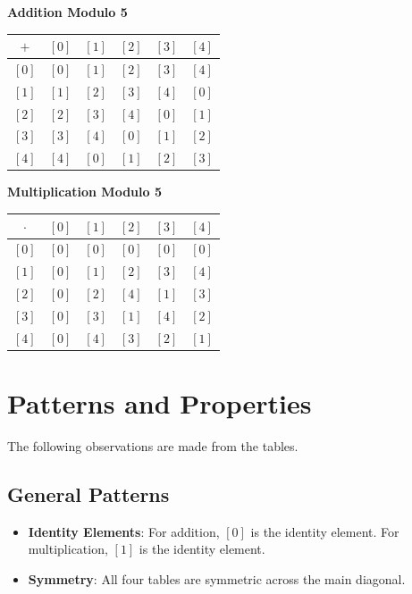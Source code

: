 \documentclass[10pt]{article}
\theoremstyle{definition}
\theoremstyle{plain}
\numberwithin{equation}{section}
\begin{document}
\vspace{1em}
\noindent
\begin{minipage}{0.45\textwidth}
  \centering
  \textbf{Addition Modulo 5}
  \vspace{0.5em}
  \begin{tabular}{|c||c|c|c|c|c|}
    \hline
    $+$ & $[0]$ & $[1]$ & $[2]$ & $[3]$ & $[4]$ \\
    \hline\hline
    $[0]$ & $[0]$ & $[1]$ & $[2]$ & $[3]$ & $[4]$ \\
    \hline
    $[1]$ & $[1]$ & $[2]$ & $[3]$ & $[4]$ & $[0]$ \\
    \hline
    $[2]$ & $[2]$ & $[3]$ & $[4]$ & $[0]$ & $[1]$ \\
    \hline
    $[3]$ & $[3]$ & $[4]$ & $[0]$ & $[1]$ & $[2]$ \\
    \hline
    $[4]$ & $[4]$ & $[0]$ & $[1]$ & $[2]$ & $[3]$ \\
    \hline
  \end{tabular}
\end{minipage}
\hfill
\begin{minipage}{0.45\textwidth}
  \centering
  \textbf{Multiplication Modulo 5}
  \vspace{0.5em}
  \begin{tabular}{|c||c|c|c|c|c|}
    \hline
    $\cdot$ & $[0]$ & $[1]$ & $[2]$ & $[3]$ & $[4]$ \\
    \hline\hline
    $[0]$ & $[0]$ & $[0]$ & $[0]$ & $[0]$ & $[0]$ \\
    \hline
    $[1]$ & $[0]$ & $[1]$ & $[2]$ & $[3]$ & $[4]$ \\
    \hline
    $[2]$ & $[0]$ & $[2]$ & $[4]$ & $[1]$ & $[3]$ \\
    \hline
    $[3]$ & $[0]$ & $[3]$ & $[1]$ & $[4]$ & $[2]$ \\
    \hline
    $[4]$ & $[0]$ & $[4]$ & $[3]$ & $[2]$ & $[1]$ \\
    \hline
  \end{tabular}
\end{minipage}
\vspace{2em}

\section*{Patterns and Properties}
The following observations are made from the tables.

\subsection*{General Patterns}
\begin{itemize}
  \item \textbf{Identity Elements}: For addition, $[0]$ is the identity element. For multiplication, $[1]$ is the identity element.
  \item \textbf{Symmetry}: All four tables are symmetric across the main diagonal.
\end{itemize}
\end{document}
